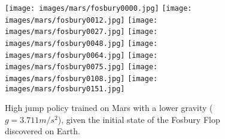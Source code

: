 \begin{figure*}
    \centering
    \texttt{[image: images/mars/fosbury0000.jpg]}
    \texttt{[image: images/mars/fosbury0012.jpg]}
    \texttt{[image: images/mars/fosbury0027.jpg]}
    \texttt{[image: images/mars/fosbury0048.jpg]}
    \texttt{[image: images/mars/fosbury0064.jpg]}
    \texttt{[image: images/mars/fosbury0075.jpg]}
    \texttt{[image: images/mars/fosbury0108.jpg]}
    \texttt{[image: images/mars/fosbury0151.jpg]}
    \caption{High jump policy trained on Mars with a lower gravity ($g=3.711 m/s^2$), given the initial state of the Fosbury Flop discovered on Earth.}
    \label{fig:High-jump-mars}
\end{figure*}
